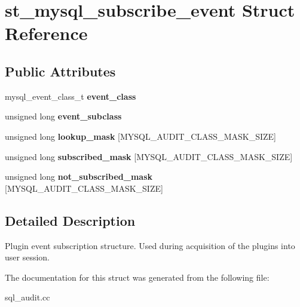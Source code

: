 \hypertarget{structst__mysql__subscribe__event}{}\section{st\+\_\+mysql\+\_\+subscribe\+\_\+event Struct Reference}
\label{structst__mysql__subscribe__event}
\subsection*{Public Attributes}
\begin{DoxyCompactItemize}
\item 
\mbox{\label{structst__mysql__subscribe__event_a6af4d776d990a6c3847ecd3f317b2bdc}} 
mysql\+\_\+event\+\_\+class\+\_\+t {\bfseries event\+\_\+class}
\item 
\mbox{\label{structst__mysql__subscribe__event_acfb619cec0cf90f1c27dbf7fe21d03bc}} 
unsigned long {\bfseries event\+\_\+subclass}
\item 
\mbox{\label{structst__mysql__subscribe__event_a787fc4988b04c9ee8562fa0669669404}} 
unsigned long {\bfseries lookup\+\_\+mask} \mbox{[}M\+Y\+S\+Q\+L\+\_\+\+A\+U\+D\+I\+T\+\_\+\+C\+L\+A\+S\+S\+\_\+\+M\+A\+S\+K\+\_\+\+S\+I\+ZE\mbox{]}
\item 
\mbox{\label{structst__mysql__subscribe__event_aa8c3657fb7126ec8b4f99f93701192af}} 
unsigned long {\bfseries subscribed\+\_\+mask} \mbox{[}M\+Y\+S\+Q\+L\+\_\+\+A\+U\+D\+I\+T\+\_\+\+C\+L\+A\+S\+S\+\_\+\+M\+A\+S\+K\+\_\+\+S\+I\+ZE\mbox{]}
\item 
\mbox{\label{structst__mysql__subscribe__event_aa7eb7628ca8e8383c5407d3edd0f5315}} 
unsigned long {\bfseries not\+\_\+subscribed\+\_\+mask} \mbox{[}M\+Y\+S\+Q\+L\+\_\+\+A\+U\+D\+I\+T\+\_\+\+C\+L\+A\+S\+S\+\_\+\+M\+A\+S\+K\+\_\+\+S\+I\+ZE\mbox{]}
\end{DoxyCompactItemize}


\subsection{Detailed Description}
Plugin event subscription structure. Used during acquisition of the plugins into user session. 

The documentation for this struct was generated from the following file\+:\begin{DoxyCompactItemize}
\item 
sql\+\_\+audit.\+cc\end{DoxyCompactItemize}

